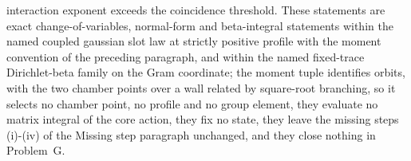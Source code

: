 interaction exponent exceeds the coincidence threshold. These statements are exact change-of-variables, normal-form and beta-integral statements within the named coupled gaussian slot law at strictly positive profile with the moment convention of the preceding paragraph, and within the named fixed-trace Dirichlet-beta family on the Gram coordinate; the moment tuple identifies orbits, with the two chamber points over a wall related by square-root branching, so it selects no chamber point, no profile and no group element, they evaluate no matrix integral of the core action, they fix no state, they leave the missing steps (i)-(iv) of the Missing step paragraph unchanged, and they close nothing in Problem~G.
